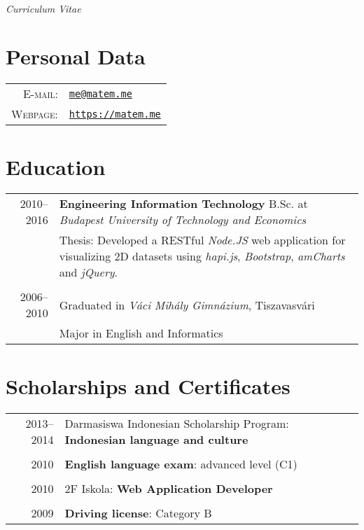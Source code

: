 \documentclass[a4paper,10pt]{article} %
\begin{document}
\pagestyle{empty} %

\par{}\\ \emph{Curriculum Vitae}\bigskip


\section{Personal Data}
\begin{tabular}{rl}
\textsc{E-mail:} & \href{mailto:me@matem.me}{\texttt{me@matem.me}} \\
\textsc{Webpage:} & \href{https://matem.me}{\texttt{https://matem.me}}
\end{tabular}


\section{Education}
\begin{tabular}{r|p{12.5cm}}
\textsc{2010--2016} & \textbf{Engineering Information Technology} B.Sc. at \emph{Budapest University of Technology and Economics}\\
& \footnotesize{Thesis: } Developed a RESTful \emph{Node.JS} web application for visualizing 2D datasets using \emph{hapi.js}, \emph{Bootstrap}, \emph{amCharts}  and \emph{jQuery}.\\
\multicolumn{2}{c}{} \\
\textsc{2006--2010} & Graduated in \emph{Váci Mihály Gimnázium}, Tiszavasvári \\
& \footnotesize{Major in English and Informatics}\\
\end{tabular}


\section{Scholarships and Certificates}
\begin{tabular}{r|p{12.5cm}}
\textsc{2013--2014} & Darmasiswa Indonesian Scholarship Program: \textbf{Indonesian language and culture}  \\
\multicolumn{2}{c}{} \\
2010 & \textbf{English language exam}: advanced level (\textsc{C1})  \\
\multicolumn{2}{c}{} \\
2010 & 2F Iskola: \textbf{Web Application Developer}  \\
\multicolumn{2}{c}{} \\
2009 & \textbf{Driving license}: Category B  \\
\end{tabular}
\end{document}
